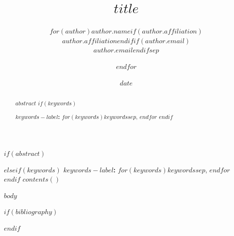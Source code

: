 \documentclass[$for(classoption)$$classoption$$sep$,$endfor$]{report}
\title{$title$}
\author{$for(author)$$author.name$$if(author.affiliation)$\\{\small $author.affiliation$}$endif$$if(author.email)$\\{\small\texttt{$author.email$}}$endif$$sep$ \and $endfor$}
\date{$date$}
\begin{document}
\maketitle
$if(abstract)$
\begin{abstract}
$abstract$
$if(keywords)$

\medskip\noindent\textbf{$keywords-label$:} $for(keywords)$$keywords$$sep$, $endfor$
$endif$
\end{abstract}
$elseif(keywords)$
\noindent\textbf{$keywords-label$:} $for(keywords)$$keywords$$sep$, $endfor$
$endif$
$contents()$
\clearpage

$body$

$if(bibliography)$


$endif$
\end{document}
